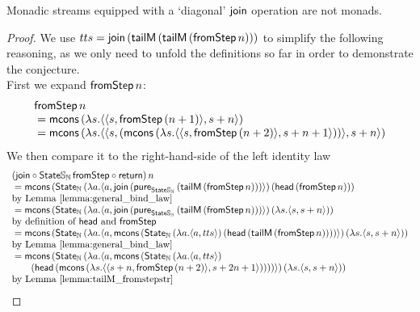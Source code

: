 \begin{conjecture}\label{lemma:monad_counterexample}
Monadic streams equipped with a `diagonal' $\mathsf{join}$ operation are not monads.
\end{conjecture}
\begin{proof}
We use $tts = \mathsf{join}\, (\mathsf{tailM}\, (\mathsf{tailM}\, (\mathsf{fromStep}\, n)))$ to simplify the following reasoning, as we only need to unfold the definitions so far in order to demonstrate the conjecture. \\

First we expand $\fromstepstr\, n$:
$$
\begin{array}{ll}
\fromstepstr\, n \\
{}= \mcons\, (\lambda s. \pair{\pair{s}{\fromstepstr\, (n + 1)}}{s + n})\\
{}= \mcons\, (\lambda s. \pair{\pair{s}{(\mcons\, (\lambda s. \pair{\pair{s}{\fromstepstr\, (n + 2)}}{s + n + 1}))}}{s + n}) \\
\end{array} 
$$
We then compare it to the right-hand-side of the left identity law
$$
\begin{array}{ll}
(\join \comp  \state\stream{\nat}\, \fromstepstr \comp \return)\, n \\
{}= \mcons\, (\state_{\nat} \,(\lambda a . \pair{a}{\join\, (\apure_{\state\stream{\nat}}\, (\mathsf{tailM}\, (\fromstepstr\, n)))})\, (\head\, (\fromstepstr\, n))) \\
 \mbox{by Lemma \ref{lemma:general_bind_law}}  \\
{}= \mcons\, (\state_{\nat}\,(\lambda a . \pair{a}{\join\, (\apure_{\state\stream{\nat}}\,(\mathsf{tailM}\, (\fromstepstr\, n)))})\, (\lambda s. \pair{s}{s + n})) \\
 \mbox{by definition of } \head \mbox{ and } \fromstepstr \\
{}= \mcons\, (\state_{\nat}\,(\lambda a . \pair{a}{  
\mcons\, (\state_{\nat} \,(\lambda a . \pair{a}{tts})\, (\head\, (\mathsf{tailM}\, (\fromstepstr\, n))))
})\, (\lambda s. \pair{s}{s + n})) \\
 \mbox{by Lemma \ref{lemma:general_bind_law}}\\
{}= \mcons\, (\state_{\nat}\,(\lambda a . \pair{a}{  
\mcons\, (\state_{\nat} \,(\lambda a . \pair{a}{tts})\, \\\qquad(\head\, (\mcons\, (\lambda s . \pair{\pair{s+n}{\fromstepstr\, (n + 2)}}{s + 2n + 1}))))
})\, (\lambda s. \pair{s}{s + n})) \\
 \mbox{by Lemma \ref{lemma:tailM_fromstepstr}}\\

\end{array}$$
\end{proof}
